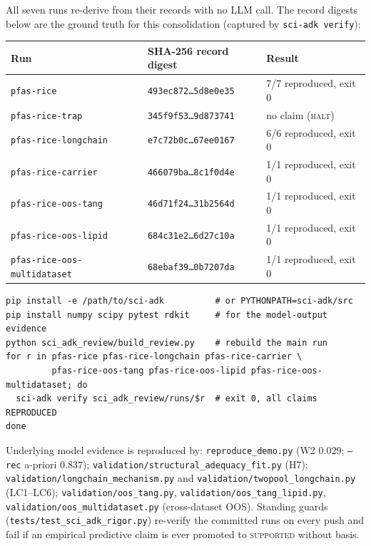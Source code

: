\documentclass[11pt]{article}
\begin{document}
All seven runs re-derive from their records with no LLM call. The
record digests below are the ground truth for this consolidation
(captured by \texttt{sci-adk verify}):

\begin{center}
\begin{tabular}{l l l}
\toprule
Run & SHA-256 record digest & Result \\
\midrule
\texttt{pfas-rice}                  & \texttt{493ec872\ldots5d8e0e35} & 7/7 reproduced, exit 0 \\
\texttt{pfas-rice-trap}             & \texttt{345f9f53\ldots9d873741} & no claim (\textsc{halt}) \\
\texttt{pfas-rice-longchain}        & \texttt{e7c72b0c\ldots67ee0167} & 6/6 reproduced, exit 0 \\
\texttt{pfas-rice-carrier}          & \texttt{466079ba\ldots8c1f0d4e} & 1/1 reproduced, exit 0 \\
\texttt{pfas-rice-oos-tang}         & \texttt{46d71f24\ldots31b2564d} & 1/1 reproduced, exit 0 \\
\texttt{pfas-rice-oos-lipid}        & \texttt{684c31e2\ldots6d27c10a} & 1/1 reproduced, exit 0 \\
\texttt{pfas-rice-oos-multidataset} & \texttt{68ebaf39\ldots0b7207da} & 1/1 reproduced, exit 0 \\
\bottomrule
\end{tabular}
\end{center}

\begin{verbatim}
pip install -e /path/to/sci-adk          # or PYTHONPATH=sci-adk/src
pip install numpy scipy pytest rdkit     # for the model-output evidence
python sci_adk_review/build_review.py    # rebuild the main run
for r in pfas-rice pfas-rice-longchain pfas-rice-carrier \
         pfas-rice-oos-tang pfas-rice-oos-lipid pfas-rice-oos-multidataset; do
  sci-adk verify sci_adk_review/runs/$r  # exit 0, all claims REPRODUCED
done
\end{verbatim}

Underlying model evidence is reproduced by: \texttt{reproduce\_demo.py}
(W2 $0.029$; \texttt{--rec} a-priori $0.837$);
\texttt{validation/structural\_adequacy\_fit.py} (H7);
\texttt{validation/longchain\_mechanism.py} and
\texttt{validation/twopool\_longchain.py} (LC1--LC6);
\texttt{validation/oos\_tang.py},
\texttt{validation/oos\_tang\_lipid.py},
\texttt{validation/oos\_multidataset.py} (cross-dataset OOS). Standing
guards (\texttt{tests/test\_sci\_adk\_rigor.py}) re-verify the committed
runs on every push and fail if an empirical predictive claim is ever
promoted to \textsc{supported} without basis.
\end{document}
